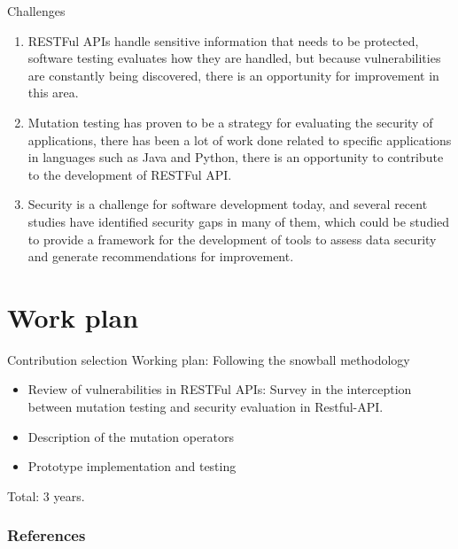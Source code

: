 \documentclass[10pt]{beamer}
\theoremstyle{remark}
\theoremstyle{definition}
\begin{document}
\begin{frame}{Challenges}
\begin{enumerate}
    \item RESTFul APIs handle sensitive information that needs to be protected, software testing evaluates how they are handled, but because vulnerabilities are constantly being discovered, there is an opportunity for improvement in this area.
    \item Mutation testing has proven to be a strategy for evaluating the security of applications, there has been a lot of work done related to specific applications in languages such as Java and Python, there is an opportunity to contribute to the development of RESTFul API.
    \item Security is a challenge for software development today, and several recent studies have identified security gaps in many of them, which could be studied to provide a framework for the development of tools to assess data security and generate recommendations for improvement.
\end{enumerate}
\end{frame}


\section{Work plan}

\begin{frame}{Contribution selection}
Working plan: Following the snowball methodology
\begin{itemize}
    \item Review of vulnerabilities in RESTFul APIs: Survey in the interception between mutation testing and security evaluation in Restful-API.
    \item Description of the mutation operators
    \item Prototype implementation and testing
\end{itemize}
Total: 3 years.
\end{frame}


\begin{frame}[allowframebreaks]
\frametitle{References}
  \printbibliography
\end{frame}
\end{document}
